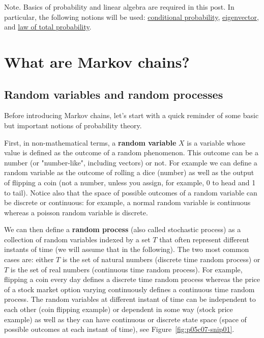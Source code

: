 Note. Basics of probability and linear algebra are required in this post. In particular, the following notions will be used: 
\href{https://en.wikipedia.org/wiki/Conditional_probability}{conditional probability}, 
\href{https://en.wikipedia.org/wiki/Eigenvalues_and_eigenvectors}{eigenvector}, and 
\href{https://en.wikipedia.org/wiki/Law_of_total_probability}{law of total probability}.

\section{What are Markov chains?}
\subsection{Random variables and random processes}

Before introducing Markov chains, let's start with a quick reminder of some basic but important notions of probability theory.

First, in non-mathematical terms, a \textbf{random variable} $X$ is a variable whose value is defined as the outcome of a random phenomenon. This outcome can be a number (or "number-like", including vectors) or not. For example we can define a random variable as the outcome of rolling a dice (number) as well as the output of flipping a coin (not a number, unless you assign, for example, 0 to head and 1 to tail). Notice also that the space of possible outcomes of a random variable can be discrete or continuous: for example, a normal random variable is continuous whereas a poisson random variable is discrete.

We can then define a \textbf{random process} (also called stochastic process) as a collection of random variables indexed by a set $T$ that often represent different instants of time (we will assume that in the following). The two most common cases are: either $T$ is the set of natural numbers (discrete time random process) or $T$ is the set of real numbers (continuous time random process). For example, flipping a coin every day defines a discrete time random process whereas the price of a stock market option varying continuously defines a continuous time random process. The random variables at different instant of time can be independent to each other (coin flipping example) or dependent in some way (stock price example) as well as they can have continuous or discrete state space (space of possible outcomes at each instant of time), see Figure~\ref{fig:p05c07-snip01}.

